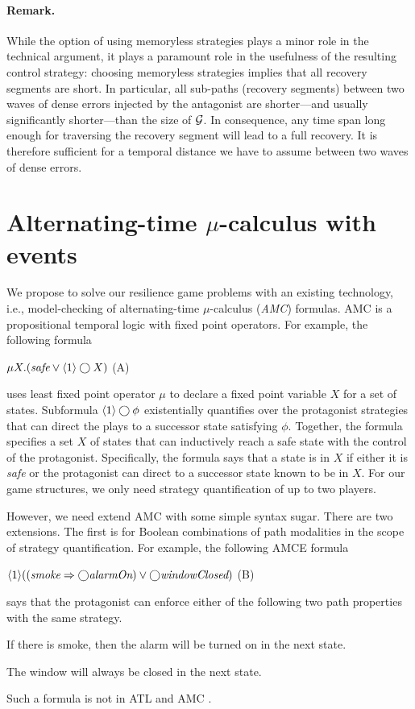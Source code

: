 \paragraph{\bf Remark.}\hspace*{-2ex}
While the option of using memoryless strategies plays a minor role in the technical argument, it plays a paramount role in the usefulness of the resulting control strategy:
choosing memoryless strategies implies that all recovery segments are short.
In particular, all sub-paths (recovery segments) between two waves of dense errors injected by the antagonist are shorter---and usually significantly shorter---than the size of ${\cal G}$.
In consequence, any time span long enough for traversing the recovery segment will lead to a full recovery.
It is therefore sufficient for a temporal distance we have to assume between two waves of dense errors.





\section{Alternating-time $\mu$-calculus with events}
We propose to solve our resilience game problems with an 
existing technology, i.e., model-checking of alternating-time $\mu$-calculus 
({\em AMC}) formulas.  
AMC is a propositional temporal logic 
with fixed point operators.  
For example, the following formula 
\begin{center} 
\hfill 
$\mu X.(\text{\em safe}\vee \langle 1\rangle \bigcirc X)$
\hfill (A) 
\end{center} 
uses least fixed point operator $\mu$ to declare a fixed point variable 
$X$ for a set of states. 
Subformula $\langle 1\rangle \bigcirc \phi$ existentially 
quantifies over 
the protagonist strategies that can direct the plays to a successor state 
satisfying $\phi$.  
Together, the formula specifies a set $X$ of states that can inductively reach a safe 
state with the control of the protagonist. 
Specifically, the formula says that a state is in $X$ if 
either it is {\em safe} 
or the protagonist can direct to a successor state known to be 
in $X$.  
For our game structures, we only need strategy quantification 
of up to two players.  

However, we need extend AMC with some simple syntax sugar.  
There are two extensions.  
The first is for Boolean combinations of path modalities in the 
scope of strategy quantification. 
For example, the following AMCE formula 
\begin{center} 
\hfill 
$\langle 1\rangle((\mbox{\em smoke}\Rightarrow\bigcirc\mbox{\em alarmOn})\vee 
\bigcirc\mbox{\em windowClosed})$ 
\hfill (B) 
\end{center} 
says that the protagonist can enforce either of 
the following two path properties with the same strategy. 
\begin{list1} 
\item If there is smoke, then the alarm will be turned on in the next state. 
\item The window will always be closed in the next state.  
\end{list1} 
Such a formula is not in ATL and AMC \cite{AHK02}.  

